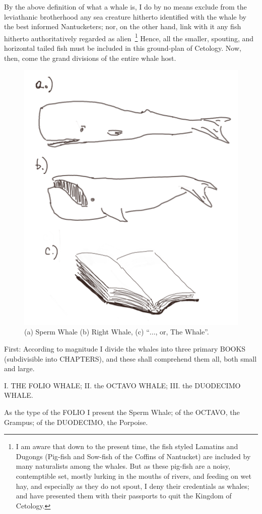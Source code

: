 By the above definition of what a whale is, I do by no means exclude from the leviathanic brotherhood any sea creature hitherto identified with the whale by the best informed Nantucketers; nor, on the other hand, link with it any fish hitherto authoritatively regarded as alien~\footnote{I am aware that down to the present time, the fish styled Lamatins and Dugongs (Pig-fish and Sow-fish of the Coffins of Nantucket) are included by many naturalists among the whales. But as these pig-fish are a noisy, contemptible set, mostly lurking in the mouths of rivers, and feeding on wet hay, and especially as they do not spout, I deny their credentials as whales; and have presented them with their passports to quit the Kingdom of Cetology.} Hence, all the smaller, spouting, and horizontal tailed fish must be included in this ground-plan of Cetology. Now, then, come the grand divisions of the entire whale host.

\begin{figure}
\begin{center}
\includegraphics[width=0.40\hsize]{Energy/figures/Whales.png}
\end{center}
\caption{(a) Sperm Whale (b) Right Whale, (c) ``$\ldots$, or, The Whale''.}
\label{fig:Whale}
\end{figure}

First: According to magnitude I divide the whales into three primary BOOKS (subdivisible into CHAPTERS), and these shall comprehend them all, both small and large.

I. THE FOLIO WHALE; II. the OCTAVO WHALE; III. the DUODECIMO WHALE.

As the type of the FOLIO I present the Sperm Whale; of the OCTAVO, the Grampus; of the DUODECIMO, the Porpoise.

